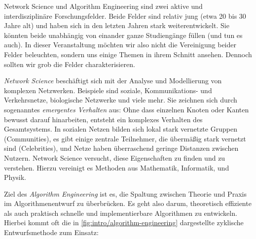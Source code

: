 \glqq Network Science\grqq{} und \glqq Algorithm Engineering\grqq{} sind zwei aktive und interdisziplinäre Forschungsfelder.
Beide Felder sind relativ jung (etwa 20 bis 30 Jahre alt) und haben sich in den letzten Jahren stark weiterentwickelt.
Sie könnten beide unabhängig von einander ganze Studiengänge füllen (und tun es auch).
In dieser Veranstaltung möchten wir also nicht die Vereinigung beider Felder beleuchten, sondern uns einige Themen in ihrem Schnitt ansehen.
Dennoch sollten wir grob die Felder charakterisieren.

\emph{Network Science} beschäftigt sich mit der Analyse und Modellierung von komplexen Netzwerken.
Beispiele sind soziale, Kommunikations- und Verkehrsnetze, biologische Netzwerke und viele mehr.
Sie zeichnen sich durch sogenanntes \emph{emergentes Verhalten} aus: Ohne dass einzelnen Knoten oder Kanten bewusst darauf hinarbeiten, entsteht ein komplexes Verhalten des Gesamtsystems.
In sozialen Netzen bilden sich \zB lokal stark vernetzte Gruppen (Communities), es gibt einige zentrale Teilnehmer, die übermäßig stark vernetzt sind (Celebrities), und Netze haben überraschend geringe Distanzen zwischen Nutzern.
Network Science versucht, diese Eigenschaften zu finden und zu verstehen.
Hierzu vereinigt es Methoden aus Mathematik, Informatik, und Physik.

\vspace{-2em}
Ziel des \emph{Algorithm Engineering} ist es, die Spaltung zwischen Theorie und Praxis im Algorithmenentwurf zu überbrücken.
Es geht also darum, theoretisch effiziente als auch praktisch schnelle und implementierbare Algorithmen zu entwickeln.
Hierbei kommt oft die in \cref{fig:intro/algorithm-engineering} dargestellte zyklische Entwurfsmethode zum Einsatz:

